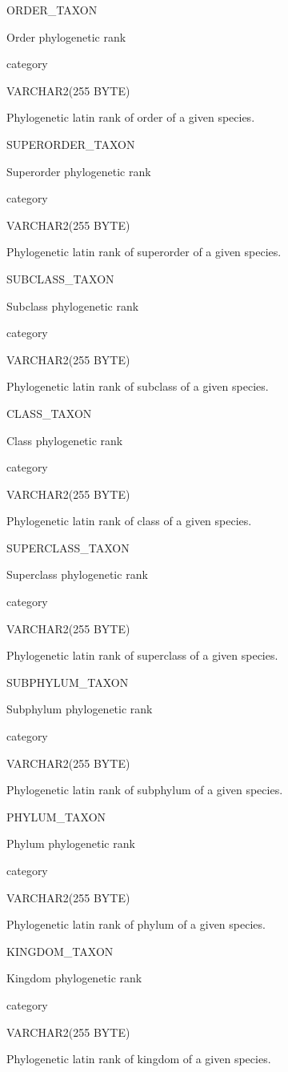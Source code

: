 \documentclass[
  letterpaper,
  oneside,
  open=any]{scrbook}
\begin{document}
ORDER\_TAXON

Order phylogenetic rank

category

VARCHAR2(255 BYTE)

Phylogenetic latin rank of order of a given species.

SUPERORDER\_TAXON

Superorder phylogenetic rank

category

VARCHAR2(255 BYTE)

Phylogenetic latin rank of superorder of a given species.

SUBCLASS\_TAXON

Subclass phylogenetic rank

category

VARCHAR2(255 BYTE)

Phylogenetic latin rank of subclass of a given species.

CLASS\_TAXON

Class phylogenetic rank

category

VARCHAR2(255 BYTE)

Phylogenetic latin rank of class of a given species.

SUPERCLASS\_TAXON

Superclass phylogenetic rank

category

VARCHAR2(255 BYTE)

Phylogenetic latin rank of superclass of a given species.

SUBPHYLUM\_TAXON

Subphylum phylogenetic rank

category

VARCHAR2(255 BYTE)

Phylogenetic latin rank of subphylum of a given species.

PHYLUM\_TAXON

Phylum phylogenetic rank

category

VARCHAR2(255 BYTE)

Phylogenetic latin rank of phylum of a given species.

KINGDOM\_TAXON

Kingdom phylogenetic rank

category

VARCHAR2(255 BYTE)

Phylogenetic latin rank of kingdom of a given species.
\end{document}
